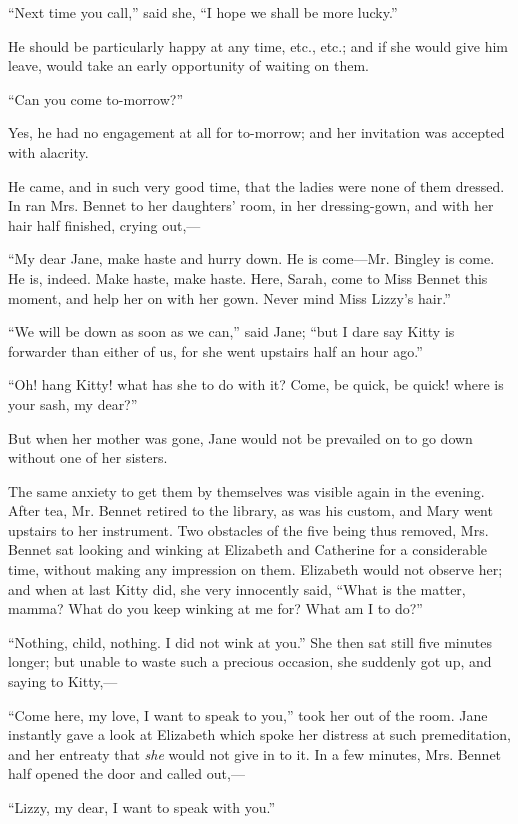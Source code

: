 \documentclass[12pt,openright]{book}
\begin{document}
“Next time you call,” said she, “I hope we shall be more lucky.”

He should be particularly happy at any time, etc., etc.; and if she would give him leave, would take an early opportunity of waiting on them.

“Can you come to-morrow?”

Yes, he had no engagement at all for to-morrow; and her invitation was accepted with alacrity.

He came, and in such very good time, that the ladies were none of them dressed. In ran Mrs. Bennet to her daughters’ room, in her dressing-gown, and with her hair half finished, crying out,—

“My dear Jane, make haste and hurry down. He is come—Mr. Bingley is come. He is, indeed. Make haste, make haste. Here, Sarah, come to Miss Bennet this moment, and help her on with her gown. Never mind Miss Lizzy’s hair.”

“We will be down as soon as we can,” said Jane; “but I dare say Kitty is forwarder than either of us, for she went upstairs half an hour ago.”

“Oh! hang Kitty! what has she to do with it? Come, be quick, be quick! where is your sash, my dear?”

But when her mother was gone, Jane would not be prevailed on to go down without one of her sisters.

The same anxiety to get them by themselves was visible again in the evening. After tea, Mr. Bennet retired to the library, as was his custom, and Mary went upstairs to her instrument. Two obstacles of the five being thus removed, Mrs. Bennet sat looking and winking at Elizabeth and Catherine for a considerable time, without making any impression on them. Elizabeth would not observe her; and when at last Kitty did, she very innocently said, “What is the matter, mamma? What do you keep winking at me for? What am I to do?”

“Nothing, child, nothing. I did not wink at you.” She then sat still five minutes longer; but unable to waste such a precious occasion, she suddenly got up, and saying to Kitty,—

“Come here, my love, I want to speak to you,” took her out of the room. Jane instantly gave a look at Elizabeth which spoke her distress at such premeditation, and her entreaty that \textit{she} would not give in to it. In a few minutes, Mrs. Bennet half opened the door and called out,—

“Lizzy, my dear, I want to speak with you.”
\end{document}
